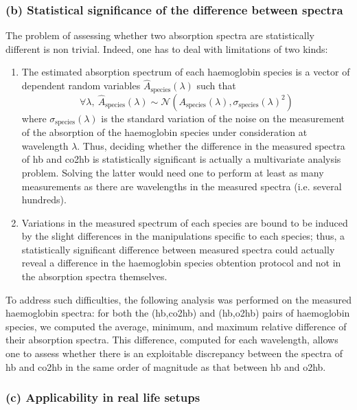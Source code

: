 \subsubsection*{(b) Statistical significance of the difference between spectra}

The problem of assessing whether two absorption spectra are statistically different is non trivial. Indeed, one has to deal with limitations of two kinds:
\begin{enumerate}
	\item The estimated absorption spectrum of each haemoglobin species is a vector of dependent random variables $\hat{A}_\text{species}(\lambda)$ such that
	\begin{equation}
		\forall \lambda,\ \hat{A}_\text{species}(\lambda) \sim \mathcal{N}\left(A_\text{species}(\lambda),\sigma_\text{species}(\lambda)^2\right)
	\end{equation}
	where $\sigma_\text{species}(\lambda)$ is the standard variation of the noise on the measurement of the absorption of the haemoglobin species under consideration at wavelength $\lambda$. Thus, deciding whether the difference in the measured spectra of \gls{hb} and \gls{co2hb} is statistically significant is actually a multivariate analysis problem. Solving the latter would need one to perform at least as many measurements as there are wavelengths in the measured spectra (i.e. several hundreds)\cite{rencher2002}.
	\item Variations in the measured spectrum of each species are bound to be induced by the slight differences in the manipulations specific to each species; thus, a statistically significant difference between measured spectra could actually reveal a difference in the haemoglobin species obtention protocol and not in the absorption spectra themselves.
\end{enumerate}

To address such difficulties, the following analysis was performed on the measured haemoglobin spectra: for both the (\gls{hb},\gls{co2hb}) and (\gls{hb},\gls{o2hb}) pairs of haemoglobin species, we computed the average, minimum, and maximum relative difference of their absorption spectra. This difference, computed for each wavelength, allows one to assess whether there is an exploitable discrepancy between the spectra of \gls{hb} and \gls{co2hb} in the same order of magnitude as that between \gls{hb} and \gls{o2hb}.

\subsubsection*{(c) Applicability in real life setups}\label{sect:co2hb:pulse_carb_feas}

